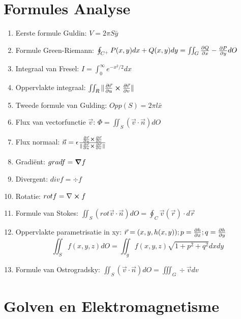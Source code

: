 \documentclass[12pt]{article}
\begin{document}
    \maketitle

    \section{Formules Analyse}
    \label{sec:formules_analyse}
   
    \begin{enumerate}
	    \item Eerste formule Guldin: $ V = 2\pi S \bar{y}$
	    \item Formule Green-Riemann: $ \oint_{C^+} P(x, y)dx + Q(x, y)dy = \iint_G \pdv{Q}{x} - \pdv{P}{y} dO $
	    \item Integraal van Fresel: $ I = \int_0^{\infty} e^{-x^2/2} dx$
    	    \item Oppervlakte integraal:  $ \iint_R \| \pdv{\vec{r}}{u} \cross \pdv{\vec{r}}{v} \| $
            \item Tweede formule van Gulding: $ Opp(S) = 2\pi l \bar{x}$
	    \item Flux van vectorfunctie $ \vec{v}$: $ \Phi = \iint_S (\vec{v} \cdot \vec{n}) dO$
	    \item Flux normaal: $\vec{n} = \epsilon \frac{\pdv{\vec{r}}{u} \cross \pdv{\vec{r}}{v}}{\| \pdv{\vec{r}}{u} \cross \pdv{\vec{r}}{v} \| }$
	    \item Gradi\"ent: $ grad f = \grad f$
	    \item Divergent: $ div f = \div f $
	    \item Rotatie: $ rot f = \nabla \cross f $
	    \item Formule van Stokes:  $ \iint_S (rot \vec{ v}\cdot \vec{n}) dO = \oint_C \vec{v}(\vec{r}) \cdot d \vec{r} $
	    \item Oppervlakte parametrisatie in xy: $ \vec{r} = (x, y, h(x,y)); p = \pdv{h}{x}; q = \pdv{h}{y} $ $$ \iint_S f(x,y,z) dO = \iint_g f(x,y,z) \sqrt{1+p^2+q^2} dxdy  $$
	    \item Formule van Ostrogradsky: $ \iint_S (\vec{v} \cdot \vec{n})dO = \iiint_G \div \vec{v} dv$
    \end{enumerate}
    

    \section{Golven en Elektromagnetisme}%
    \label{sec:section_name}
    
\end{document}
